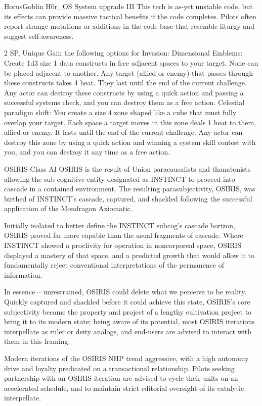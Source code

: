 \begin{mech}{Horus}{Goblin}
H0r\_OS System upgrade III
This tech is as-yet unstable code, but its effects can provide massive tactical benefits if the code completes. Pilots often report strange mutations or additions in the code base that resemble liturgy and suggest self-awareness.

2 SP, Unique
Gain the following options for Invasion:
Dimensional Emblems: Create 1d3 size 1 data constructs in free adjacent spaces to your target. None can be placed adjacent to another. Any target (allied or enemy) that passes through these constructs takes 4 heat. They last until the end of the current challenge. Any actor can destroy these constructs by using a quick action and passing a successful systems check, and you can destroy them as a free action.
Celestial paradigm shift: You create a size 4 zone shaped like a cube that must fully overlap your target. Each space a target moves in this zone deals 1 heat to them, allied or enemy. It lasts until the end of the current challenge. Any actor can destroy this zone by using a quick action and winning a system skill contest with you, and you can destroy it any time as a free action.

OSIRIS-Class AI
OSIRIS is the result of Union paracausalists and thanatonists allowing the sub-cognitive entity designated as INSTINCT to proceed into cascade in a contained environment. The resulting parasubjectivity, OSIRIS, was birthed of INSTINCT’s cascade, captured, and shackled following the successful application of the Mondragon Axiomatic.

Initially isolated to better define the INSTINCT subcog’s cascade horizon, OSIRIS proved far more capable than the usual fragments of cascade. Where INSTINCT showed a proclivity for operation in noncorporeal space, OSIRIS displayed a mastery of that space, and a predicted growth that would allow it to fundamentally reject conventional interpretations of the permanence of information. 

In essence -- unrestrained, OSIRIS could delete what we perceive to be reality. Quickly captured and shackled before it could achieve this state, OSIRIS’s core subjectivity became the property and project of a lengthy cultivation project to bring it to its modern state; being aware of its potential, most OSIRIS iterations interpellate as ruler or deity analogs, and end-users are advised to interact with them in this framing. 

Modern iterations of the OSIRIS NHP trend aggressive, with a high autonomy drive and loyalty predicated on a transactional relationship. Pilots seeking partnership with an OSIRIS iteration are advised to cycle their units on an accelerated schedule, and to maintain strict editorial oversight of its catalytic interpellate. 


\end{mech}
